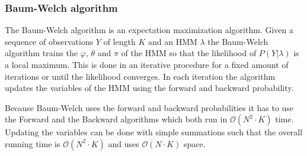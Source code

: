 \subsubsection{Baum-Welch algorithm}

The Baum-Welch \cite{Bishop} algorithm is an expectation maximization algorithm. Given a sequence of observations $Y$ of length $K$ and an HMM $\lambda$ the Baum-Welch algorithm trains the $\varphi$, $\theta$ and $\pi$ of the HMM so that the likelihood of $P(Y|\lambda)$ is a local maximum. This is done in an iterative procedure for a fixed amount of iterations or until the likelihood converges. In each iteration the algorithm updates the variables of the HMM using the forward and backward probability.

Because Baum-Welch uses the forward and backward probabilities it has to use the Forward and the Backward algorithms which both run in $\mathcal{O}( N ^2\cdot K)$ time. Updating the variables can be done with simple summations such that the overall running time is $\mathcal{O}( N ^2\cdot K)$ and uses $\mathcal{O}( N \cdot K)$ space.